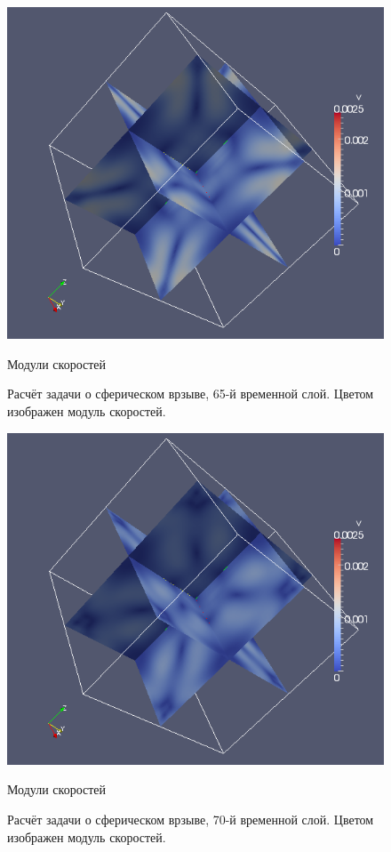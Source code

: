 \begin{figure}[htp]
\centering
\includegraphics[width=\textwidth]{png/spherical-explosion-test/v-scalar/0065.png}
\caption{Модули скоростей}
\caption{Расчёт задачи о сферическом врзыве, 65-й временной слой. Цветом изображен модуль скоростей.}
\end{figure}

\begin{figure}[htp]
\centering
\includegraphics[width=\textwidth]{png/spherical-explosion-test/v-scalar/0070.png}
\caption{Модули скоростей}
\caption{Расчёт задачи о сферическом врзыве, 70-й временной слой. Цветом изображен модуль скоростей.}
\label{pic:spherical_70}
\end{figure}

